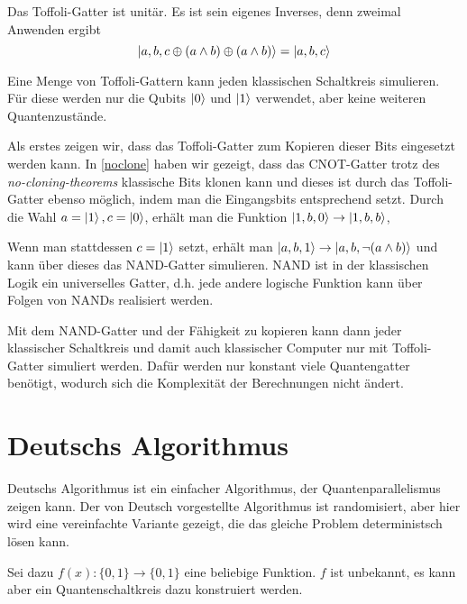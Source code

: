 \documentclass{acm_proc_article-sp}
\begin{document}
\begin{center}
    \pictureToffoli
    \label{fig:toffoli}
\end{center}


Das Toffoli-Gatter ist unitär. Es ist sein eigenes Inverses, denn zweimal Anwenden
ergibt
\[
    \left|a, b, c\oplus (a\wedge b) \oplus (a\wedge b)\right\rangle = \left|a, b, c\right\rangle
\]


Eine Menge von Toffoli-Gattern kann jeden klassischen Schaltkreis simulieren. Für diese werden nur die Qubits
$\left|0\right\rangle$ und $\left|1\right\rangle$ verwendet, aber keine weiteren Quantenzustände.

Als erstes zeigen wir, dass das Toffoli-Gatter zum Kopieren dieser Bits eingesetzt werden kann.
In \autoref{noclone} haben wir gezeigt, dass das CNOT-Gatter trotz des \emph{no-cloning-theorems} klassische
Bits klonen kann und dieses ist durch das Toffoli-Gatter ebenso möglich, indem man die
Eingangsbits entsprechend setzt.
Durch die Wahl $a = \left|1\right\rangle, c = \left|0\right\rangle$, erhält man die Funktion $\left|1,b,0\right\rangle \rightarrow \left|1,b,b\right\rangle$,

Wenn man stattdessen $c = \left|1\right\rangle$ setzt, erhält man \linebreak $\left|a,b,1\right\rangle \rightarrow \left|a,b, \neg (a\wedge b)\right\rangle$
und kann über dieses das NAND-Gatter simulieren.
NAND ist in der klassischen Logik ein universelles Gatter, d.h. 
jede andere logische Funktion kann über Folgen von NANDs realisiert werden.

Mit dem NAND-Gatter und der Fähigkeit zu kopieren kann dann jeder klassischer Schaltkreis und damit 
auch klassischer Computer nur mit Toffoli-Gatter simuliert werden. 
Dafür werden nur konstant viele Quantengatter benötigt, wodurch sich die Komplexität
der Berechnungen nicht ändert.

\section{Deutschs Algorithmus}
\label{DeutschsAlgo}

Deutschs Algorithmus ist ein einfacher Algorithmus, der \linebreak Quantenparallelismus zeigen kann. 
Der von Deutsch vorgestellte Algorithmus ist randomisiert, aber hier wird eine vereinfachte Variante
gezeigt, die das gleiche Problem deterministsch lösen kann.

Sei dazu $ f(x) : \{0,1\} \rightarrow \{0,1\} $ eine beliebige Funktion. $f$ ist unbekannt, es kann aber
ein Quantenschaltkreis dazu konstruiert werden.
\end{document}
